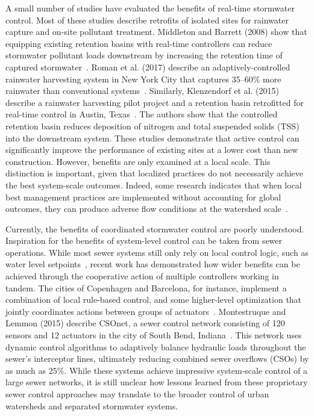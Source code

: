 A small number of studies have evaluated the benefits of real-time stormwater control. Most of these studies describe retrofits of isolated sites for rainwater capture and on-site pollutant treatment. Middleton and Barrett (2008) show that equipping existing retention basins with real-time controllers can reduce stormwater pollutant loads downstream by increasing the retention time of captured stormwater~\cite{Middleton_2008}. Roman et al. (2017) describe an adaptively-controlled rainwater harvesting system in New York City that captures 35--60\% more rainwater than conventional systems~\cite{Roman_2017}. Similarly, Klenzendorf et al. (2015) describe a rainwater harvesting pilot project and a retention basin retrofitted for real-time control in Austin, Texas~\cite{Klenzendorf_2015}. The authors show that the controlled retention basin reduces deposition of nitrogen and total suspended solids (TSS) into the downstream system. These studies demonstrate that active control can significantly improve the performance of existing sites at a lower cost than new construction. However, benefits are only examined at a local scale. This distinction is important, given that localized practices do not necessarily achieve the best system-scale outcomes. Indeed, some research indicates that when local best management practices are implemented without accounting for global outcomes, they can produce adverse flow conditions at the watershed scale~\cite{Emerson_2005}.


Currently, the benefits of coordinated stormwater control are poorly understood. Inspiration for the benefits of system-level control can be taken from sewer operations. While most sewer systems still only rely on local control logic, such as water level setpoints~\cite{Schutze2004RealToday}, recent work has demonstrated how wider benefits can be achieved through the cooperative action of multiple controllers working in tandem. The cities of Copenhagen and Barcelona, for instance, implement a combination of local rule-based control, and some higher-level optimization that jointly coordinates actions between groups of actuators~\cite{Mollerup_2016}. Montestruque and Lemmon (2015) describe CSOnet, a sewer control network consisting of 120 sensors and 12 actuators in the city of South Bend, Indiana~\cite{Montestruque_2015}. This network uses dynamic control algorithms to adaptively balance hydraulic loads throughout the sewer’s interceptor lines, ultimately reducing combined sewer overflows (CSOs) by as much as 25\%. While these systems achieve impressive system-scale control of a large sewer networks, it is still unclear how lessons learned from these proprietary sewer control approaches may translate to the broader control of urban watersheds and separated stormwater systems. 

